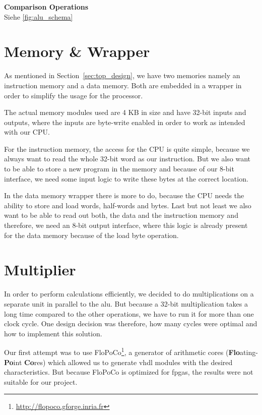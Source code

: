 \textbf{Comparison Operations} \\
Siehe \ref{fig:alu_schema}


\section{Memory \& Wrapper}

As mentioned in Section~\ref{sec:top_design}, we have two memories namely an instruction memory and a data memory. Both are embedded in a wrapper in order to simplify the usage for the processor.

The actual memory modules used are 4 KB in size and have 32-bit inputs and outputs, where the inputs are byte-write enabled in order to work as intended with our CPU.

For the instruction memory, the access for the CPU is quite simple, because we always want to read the whole 32-bit word as our instruction. But we also want to be able to store a new program in the memory and because of our 8-bit interface, we need some input logic to write these bytes at the correct location.

In the data memory wrapper there is more to do, because the CPU needs the ability to store and load words, half-words and bytes. Last but not least we also want to be able to read out both, the data and the instruction memory and therefore, we need an 8-bit output interface, where this logic is already present for the data memory because of the load byte operation.


\section{Multiplier}
\label{sec:multiplier}

In order to perform calculations efficiently, we decided to do multiplications on a separate unit in parallel to the \gls{alu}. But because a 32-bit multiplication takes a long time compared to the other operations, we have to run it for more than one clock cycle. One design decision was therefore, how many cycles were optimal and how to implement this solution.

Our first attempt was to use FloPoCo\footnote{\url{http://flopoco.gforge.inria.fr}}, a generator of arithmetic cores (\textbf{Flo}ating-\textbf{Po}int \textbf{Co}res) which allowed us to generate \gls{vhdl} modules with the desired characteristics. But because FloPoCo is optimized for \glspl{fpga}, the results were not suitable for our project.

